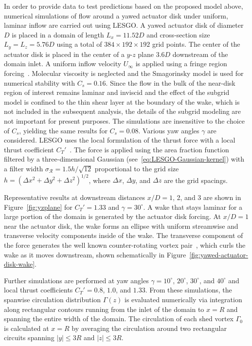 In order to provide data to test predictions based on the proposed model above, numerical simulations of flow around a yawed actuator disk under uniform, laminar inflow are carried out using LESGO. A yawed actuator disk of diameter $D$ is placed in a domain of length $L_x=11.52D$ and cross-section size $L_y=L_z=5.76D$ using a total of \mbox{$384 \times 192 \times 192$} grid points. The center of the actuator disk is placed in the center of a $y$-$z$ plane $3.6D$ downstream of the domain inlet.  A uniform inflow velocity $U_\infty$ is applied using a fringe region forcing~\cite{Stevens2014a}.  Molecular viscosity is neglected and the Smagorinsky model is used  for numerical stability with $C_s = 0.16$. Since the flow in the bulk of the near-disk region of interest remains laminar and inviscid and the effect of the subgrid model is confined to the thin shear layer at the boundary of the wake, which is not included in the subsequent analysis, the details of the subgrid modeling are not important for present purposes. The simulations are insensitive to the choice of $C_s$, yielding the same results for $C_s = 0.08$. Various yaw angles $\gamma$ are considered. LESGO uses the local formulation of the thrust force with a local thrust coefficient $C_T'$~\cite{Calaf2010a}. The force is applied using the area fraction function filtered by a three-dimensional Gaussian (see~\eqref{eq:LESGO-Gaussian-kernel}) with a filter width $\sigma_{\mathcal{R}} = 1.5 h / \sqrt{12}$ proportional to the grid size $h = (\Delta x^2 + \Delta y^2 + \Delta z^2)^{1/2}$, where $\Delta x$, $\Delta y$, and $\Delta z$ are the grid spacings.  

Representative results at downstream distances $x/D = 1$, 2, and 3 are shown in  Figure~\ref{fig:yzplane} for $C_T' = 1.33$ and  $\gamma = 30^\circ$. A wake that stays laminar for a large portion of the domain is generated by the actuator disk forcing. At $x/D=1$ near the actuator disk, the wake forms an ellipse with uniform streamwise and transverse velocity components inside of the wake. The transverse component of the force generates the well known counter-rotating vortex pair~\cite{Howland2016a, Bastankhah2016a}, which curls the wake as it moves downstream, shown schematically in Figure~\ref{fig:yawed-actuator-disk-wake}. 

Further simulations are performed at yaw angles $\gamma = 10^\circ$, $20^\circ$, $30^\circ$, and $40^\circ$ and local thrust coefficients $C_T' = 0.8$, $1.0$, and $1.33$.
From these simulations, the spanwise circulation distribution $\Gamma(z)$ is evaluated numerically via integration along rectangular contours running from the inlet of the domain to $x=R$ and spanning the entire width of the domain. The circulation of each shed vortex $\Gamma_0$ is calculated at $x=R$ by averaging the circulation around two rectangular circuits spanning $|y| \le 3R$ and $ |z| \le 3R$. 

